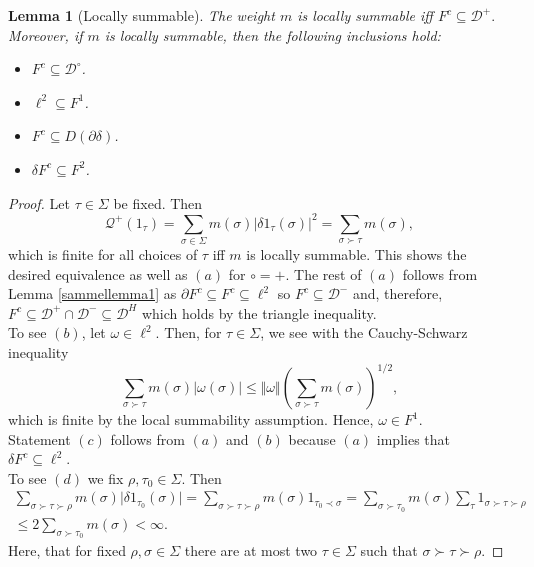 \documentclass[10pt]{amsart}
\newtheorem{lemma}[theorem]{Lemma}
\theoremstyle{definition}
\newcommand{\F}{{F}}
\renewcommand{\bullet}{{\circ}}
\newcommand{\Q}{\mathcal{Q}}
\begin{document}
\begin{lemma}[Locally summable]\label{sammellemma2}
    The weight $m$ is locally summable iff $\F^c\subseteq\mathcal{D}^+.$
    Moreover, if $m$ is locally summable, then the following inclusions hold:
    \begin{itemize}
        \item[(a)] $\F^c\subseteq\mathcal{D}^\bullet$.
        \item[(b)] $\ell^2\subseteq \F^1$.
        \item[(c)] $\F^c\subseteq D(\partial\delta)$.
        \item[(d)] $\delta \F^c\subseteq \F^2$.
    \end{itemize} 
\end{lemma}
\begin{proof}
    Let $\tau\in\Sigma$ be fixed. Then $$\Q^{+}(1_{\tau}) =\sum_{\sigma\in \Sigma}m(\sigma)\vert\delta1_{\tau}(\sigma)\vert^2 = \sum_{\sigma\succ \tau}m(\sigma),$$
    which is finite for all choices of $\tau$ iff $m$ is locally summable. This shows the desired equivalence as well as $(a)$ for $\bullet = +.$ The rest of $(a)$ follows from Lemma \ref{sammellemma1} as $\partial \F^c\subseteq \F^c\subseteq\ell^{2}$ so $\F^{c}\subseteq\mathcal{D}^-$ and, therefore, $\F^{c}\subseteq \mathcal{D}^{+}   \cap\mathcal{D}^{-}\subseteq \mathcal{D}^{H}$ which holds by the triangle inequality.\\
    To see $(b)$, let $\omega\in\ell^2.$ Then, for $\tau\in\Sigma$, we see with the Cauchy-Schwarz inequality
    $$\sum_{\sigma\succ \tau}m(\sigma)\vert\omega(\sigma)\vert\leq \Vert\omega\Vert\left(\sum_{\sigma\succ \tau}m(\sigma)\right)^{1\slash 2},$$
    which is finite by the local summability assumption. Hence, $\omega\in \F^{1}$.\\
  Statement  $(c)$ follows from $(a)$ and $(b)$ because $(a)$ implies that $\delta \F^c\subseteq \ell^2.$\\
    To see $(d)$ we fix $\rho,\tau_0\in\Sigma.$ Then
    \begin{multline*}
   \sum_{\sigma\succ \tau\succ\rho}m(\sigma)\vert\delta 1_{\tau_0}(\sigma)\vert = \sum_{\sigma\succ \tau\succ\rho} m(\sigma)1_{\tau_0\prec\sigma} = \sum_{\sigma\succ\tau_0}m(\sigma)\sum_{\tau}1_{\sigma\succ \tau\succ\rho}\\
    \leq 2\sum_{\sigma\succ\tau_0}m(\sigma)<\infty.
     \end{multline*}
    Here, %
     that for fixed $\rho,\sigma\in\Sigma$ there are at most two%
     $\tau\in\Sigma$ such that $\sigma\succ \tau\succ\rho.$
    \end{proof}
  
\end{document}
